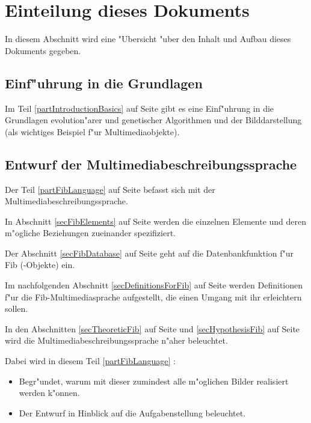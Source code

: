 \documentclass[11pt,a4paper]{article}
\begin{document}
\section{Einteilung dieses Dokuments}

In diesem Abschnitt wird eine "Ubersicht "uber den Inhalt und Aufbau dieses Dokuments gegeben.



\subsection{Einf"uhrung in die Grundlagen}

Im Teil \ref{partIntroductionBasics} auf Seite \pageref{partIntroductionBasics} gibt es eine Einf"uhrung in die Grundlagen evolution"arer und genetischer Algorithmen und der Bilddarstellung (als wichtiges Beispiel f"ur Multimediaobjekte).

\subsection{Entwurf der Multimediabeschreibungssprache}

Der Teil \ref{partFibLanguage} auf Seite \pageref{partFibLanguage} befasst sich mit der Multimediabeschreibungssprache.

In Abschnitt \ref{secFibElements} auf Seite \pageref{secFibElements} werden die einzelnen Elemente und deren m"ogliche Beziehungen zueinander spezifiziert.

Der Abschnitt \ref{secFibDatabase} auf Seite \pageref{secFibDatabase} geht auf die Datenbankfunktion f"ur Fib (-Objekte) ein.

Im nachfolgenden Abschnitt \ref{secDefinitionsForFib} auf Seite \pageref{secDefinitionsForFib} werden Definitionen f"ur die Fib-Multimediasprache aufgestellt, die einen Umgang mit ihr erleichtern sollen.

In den Abschnitten \ref{secTheoreticFib} auf Seite \pageref{secTheoreticFib} und \ref{secHypothesisFib} auf Seite \pageref{secHypothesisFib} wird die Multimediabeschreibungssprache n"aher beleuchtet.

\bigskip\noindent
Dabei wird in diesem Teil \ref{partFibLanguage} :
\begin{itemize}
 \item Begr"undet, warum mit dieser zumindest alle m"oglichen Bilder realisiert werden k"onnen.
 \item Der Entwurf in Hinblick auf die Aufgabenstellung beleuchtet.
\end{itemize}
\end{document}
